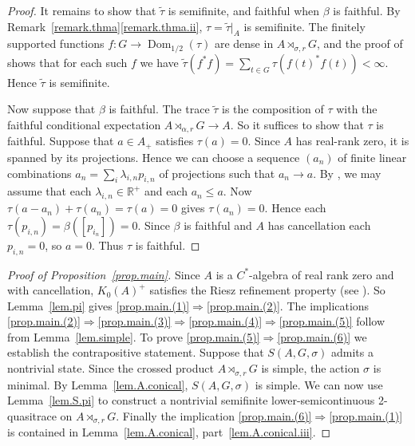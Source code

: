 \documentclass[a4paper, 12pt]{amsart}
\numberwithin{equation}{section}
\theoremstyle{remark}
\theoremstyle{definition}
\begin{document}
\begin{proof}
It remains to show that $\tilde\tau$ is semifinite, and faithful when $\beta$ is
faithful. By Remark~\ref{remark.thma}\eqref{remark.thma.ii}, $\tau = \tilde\tau|_A$ is semifinite. The
finitely supported functions $f\colon G\to {\operatorname{Dom}_{1/2}}(\tau)$ are dense in $A\rtimes_{\sigma,r}
G$, and the proof of \cite[Lemma~5.3]{MR2873171} shows that for each such $f$ we have
$\tilde\tau(f^*f) = \sum_{t\in G}\tau(f(t)^*f(t)) < \infty$. Hence $\tilde\tau$ is
semifinite.

Now suppose that $\beta$ is faithful. The trace $\tilde\tau$ is the composition of $\tau$
with the faithful conditional expectation $A\rtimes_{\alpha,r} G\to A$. So it suffices to
show that $\tau$ is faithful. Suppose that $a\in A_+$ satisfies $\tau(a)=0$. Since $A$
has real-rank zero, it is spanned by its projections. Hence we can choose
a sequence $(a_n)$ of finite linear combinations $a_n = \sum_i\lambda_{i,n}p_{i,n}$ of
projections such that $a_n \to a$. By \cite[Lemma~2.3]{MR2885587}, we may assume that
each $\lambda_{i,n}\in {\mathbb{R}}^+$ and each $a_n\leq a$. Now $\tau(a-a_n) + \tau(a_n) =
\tau(a) = 0$ gives $\tau(a_n)=0$. Hence each $\tau(p_{i,n}) = \beta([p_{i_n}])=0$. Since
$\beta$ is faithful and $A$ has cancellation each $p_{i,n}=0$, so $a=0$. Thus $\tau$ is
faithful.
\end{proof}

\begin{proof}[Proof of Proposition~\ref{prop.main}]
Since $A$ is a $C^*$-algebra of  real rank zero and with cancellation, $K_0(A)^+$ satisfies
the Riesz  refinement property (see \cite{MR1301484, MR1150618}). So Lemma~\ref{lem.pi}
gives \eqref{prop.main.(1)}$\Rightarrow$\eqref{prop.main.(2)}. The implications
\eqref{prop.main.(2)}$\Rightarrow$\eqref{prop.main.(3)}$\Rightarrow$\eqref{prop.main.(4)}$\Rightarrow$\eqref{prop.main.(5)} follow from Lemma~\ref{lem.simple}.
To prove \eqref{prop.main.(5)}$\Rightarrow$\eqref{prop.main.(6)} we establish the contrapositive statement. Suppose that
$S(A,G,\sigma)$ admits a nontrivial state. Since the crossed product $A\rtimes_{\sigma,r}
G$ is simple, the action $\sigma$ is minimal. By Lemma~\ref{lem.A.conical},
$S(A,G,\sigma)$ is simple. We can now use Lemma~\ref{lem.S.pi} to construct a nontrivial
semifinite lower-semicontinuous 2-quasitrace on $A\rtimes_{\sigma,r} G$. Finally the
implication \eqref{prop.main.(6)}$\Rightarrow$\eqref{prop.main.(1)} is contained in Lemma~\ref{lem.A.conical}, part~\eqref{lem.A.conical.iii}.
\end{proof}
\end{document}
